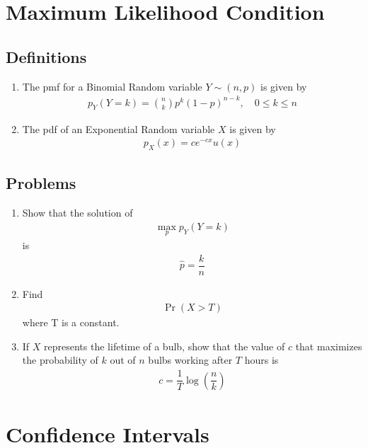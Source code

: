 \documentclass[journal,12pt,onecolumn]{IEEEtran}
\renewcommand\thesection{\arabic{section}}
\renewcommand\thesubsection{\thesection.\arabic{subsection}}
\providecommand{\pr}[1]{\ensuremath{\Pr\left(#1\right)}}
\providecommand{\brak}[1]{\ensuremath{\left(#1\right)}}
\theoremstyle{remark}
\numberwithin{equation}{section}
\begin{document}
 \section{Maximum Likelihood Condition}
 \subsection{Definitions}
\begin{enumerate}[label=\arabic*.,ref=\thesubsection.\theenumi]
\item The pmf for a Binomial Random variable  $ Y \sim \brak{n, p}$ is given by 
\begin{align}
 p_Y\brak{Y=k}  = \binom{n}{k}  p^k \brak{1-p}^{n-k}, \quad 0 \le k \le n
\end{align}
\item The pdf of an Exponential Random variable  $ X $ is given by
\begin{align}
 p_X\brak{x}  = ce^{-cx}u\brak{x}
\end{align}
\end{enumerate}
\subsection{Problems}
\begin{enumerate}[label=\arabic*.,ref=\thesubsection.\theenumi]
\item Show that  the solution of 
\begin{align}
 \max_{p} p_Y\brak{Y=k} 
\end{align} 
is 
		\begin{align}
			\hat{p} = \dfrac{k}{n} 
\end{align} 
\item  Find
\begin{align}
\pr{X > T} 
\end{align} 
		where T is a constant.
\item If $X$ represents the lifetime of a bulb,
	show that the value of $c$ that maximizes the probability of $k$ out of $n$ bulbs working after $T$ hours is
\begin{align}
c = \dfrac{1}{T}\log \brak{\dfrac{n}{k}}
\end{align}
 \end{enumerate}

 \section{Confidence Intervals}
\end{document}

